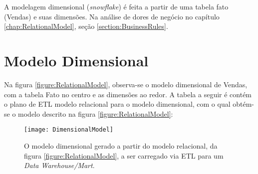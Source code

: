 \label{chap:DimensionalModel} 

A modelagem dimensional (\emph{snowflake}) é feita a partir de uma tabela fato (Vendas) e suas dimensões. Na análise de dores de negócio no capítulo \ref{chap:RelationalModel}, seção \ref{section:BusinessRules}.

\section{Modelo Dimensional}

Na figura \ref{figure:RelationalModel}, observa-se o modelo dimensional de Vendas, com a tabela Fato no centro e as dimensões ao redor. A tabela a seguir é contém o plano de ETL modelo relacional para o modelo dimensional, com o qual obtém-se o modelo descrito na figura \ref{figure:RelationalModel}:

\begin{center}
\begin{figure}[ht]
\begin{centering}
\texttt{[image: DimensionalModel]}
\par\end{centering}
  \caption{\label{figure:DimensionalModel}O modelo dimensional gerado a partir do modelo relacional, da figura \ref{figure:RelationalModel}, a ser carregado via ETL para um \emph{Data Warehouse/Mart}.}
\end{figure}
\vspace*{-40pt}
\par\end{center}


